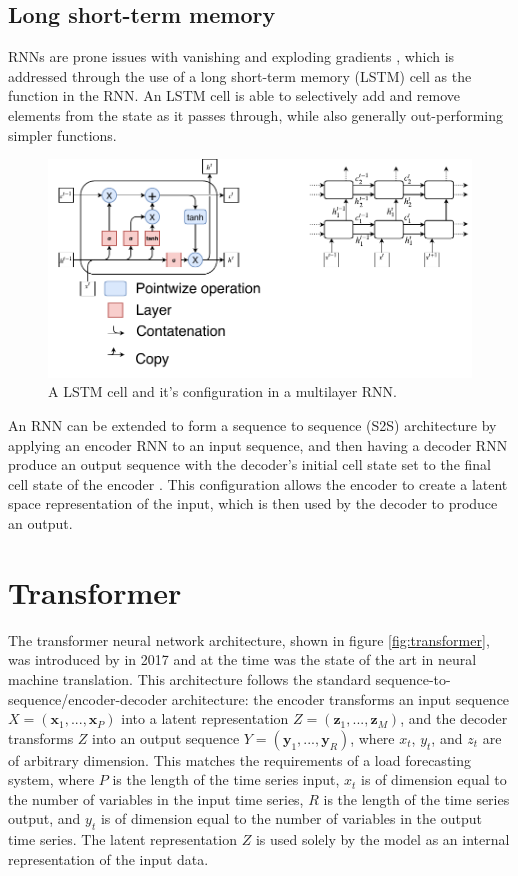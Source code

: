 \subsection{Long short-term memory}
RNNs are prone issues with vanishing and exploding gradients \cite{Goodfellow-et-al-2016}, which is addressed through the use of a long short-term memory (LSTM) \cite{hochreiter1997long} cell as the function in the RNN.
An LSTM cell is able to selectively add and remove elements from the state as it passes through, while also generally out-performing simpler functions.

\begin{figure}[htbp]
	\centerline{\includegraphics[trim=0 0cm 0 0, width=.65\textwidth]{images/LSTM.pdf}}
	\caption{A LSTM cell and it's configuration in a multilayer RNN.}
	\label{fig:LSTM}
\end{figure}


An RNN can be extended to form a sequence to sequence (S2S) architecture by applying an encoder RNN to an input sequence, and then having a decoder RNN produce an output sequence with  the decoder's initial cell state set to the final cell state of the encoder \cite{Cho2014a}.
This configuration allows the encoder to create a latent space representation of the input, which is then used by the decoder to produce an output.

\section{Transformer}
The transformer neural network architecture, shown in figure \ref{fig:transformer}, was introduced by \cite{Vaswani2017} in 2017 and at the time was the state of the art in neural machine translation.
This architecture follows the standard sequence-to-sequence/encoder-decoder architecture: the encoder transforms an input sequence $X = (\boldsymbol{x}_1, ..., \boldsymbol{x}_P)$ into a latent representation $Z = (\boldsymbol{z}_1, ..., \boldsymbol{z}_M)$, and the decoder transforms $Z$ into an output sequence $Y = (\boldsymbol{y}_1, ..., \boldsymbol{y}_R)$, where $x_t$, $y_t$, and $z_t$ are of arbitrary dimension.
This matches the requirements of a load forecasting system, where $P$ is the length of the time series input, $x_t$ is of dimension equal to the number of variables in the input time series, $R$ is the length of the time series output, and $y_t$ is of dimension equal to the number of variables in the output time series.
The latent representation $Z$ is used solely by the model as an internal representation of the input data.

